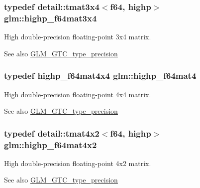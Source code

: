 \subsubsection[{\texorpdfstring{highp\+\_\+f64mat3x4}{highp_f64mat3x4}}]{\setlength{\rightskip}{0pt plus 5cm}typedef detail\+::tmat3x4$<$f64, highp$>$ {\bf glm\+::highp\+\_\+f64mat3x4}}\hypertarget{group__gtc__type__precision_ga4144f547189dd7e52b4dd282f41a1cd1}{}\label{group__gtc__type__precision_ga4144f547189dd7e52b4dd282f41a1cd1}
High double-\/precision floating-\/point 3x4 matrix. \begin{DoxySeeAlso}{See also}
\hyperlink{group__gtc__type__precision}{G\+L\+M\+\_\+\+G\+T\+C\+\_\+type\+\_\+precision} 
\end{DoxySeeAlso}
\subsubsection[{\texorpdfstring{highp\+\_\+f64mat4}{highp_f64mat4}}]{\setlength{\rightskip}{0pt plus 5cm}typedef highp\+\_\+f64mat4x4 {\bf glm\+::highp\+\_\+f64mat4}}\hypertarget{group__gtc__type__precision_ga1ac5d0564721a22765c68c54a0a4f87a}{}\label{group__gtc__type__precision_ga1ac5d0564721a22765c68c54a0a4f87a}
High double-\/precision floating-\/point 4x4 matrix. \begin{DoxySeeAlso}{See also}
\hyperlink{group__gtc__type__precision}{G\+L\+M\+\_\+\+G\+T\+C\+\_\+type\+\_\+precision} 
\end{DoxySeeAlso}
\subsubsection[{\texorpdfstring{highp\+\_\+f64mat4x2}{highp_f64mat4x2}}]{\setlength{\rightskip}{0pt plus 5cm}typedef detail\+::tmat4x2$<$f64, highp$>$ {\bf glm\+::highp\+\_\+f64mat4x2}}\hypertarget{group__gtc__type__precision_gabe9bc3680e7d83a7b34297da518a8117}{}\label{group__gtc__type__precision_gabe9bc3680e7d83a7b34297da518a8117}
High double-\/precision floating-\/point 4x2 matrix. \begin{DoxySeeAlso}{See also}
\hyperlink{group__gtc__type__precision}{G\+L\+M\+\_\+\+G\+T\+C\+\_\+type\+\_\+precision} 
\end{DoxySeeAlso}
